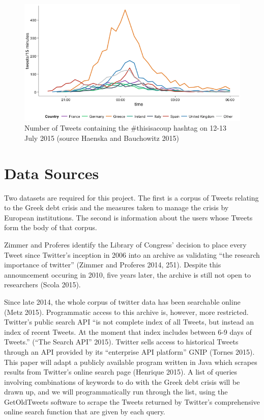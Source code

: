 \documentclass[]{article}
\begin{document}
\begin{figure}[htbp]
\centering
\includegraphics{img/Greece-twitter-2.png}
\caption{Number of Tweets containing the \#thisisacoup hashtag on 12-13
July 2015 (source Haenska and Bauchowitz 2015)}
\end{figure}

\section{Data Sources}\label{data-sources}

Two datasets are required for this project. The first is a corpus of
Tweets relating to the Greek debt crisis and the measures taken to
manage the crisis by European institutions. The second is information
about the users whose Tweets form the body of that corpus.

Zimmer and Proferes identify the Library of Congress' decision to place
every Tweet since Twitter's inception in 2006 into an archive as
validating ``the research importance of twitter'' (Zimmer and Proferes
2014, 251). Despite this announcement occuring in 2010, five years
later, the archive is still not open to researchers (Scola 2015).

Since late 2014, the whole corpus of twitter data has been searchable
online (Metz 2015). Programmatic access to this archive is, however,
more restricted. Twitter's public search API ``is not complete index of
all Tweets, but instead an index of recent Tweets. At the moment that
index includes between 6-9 days of Tweets.'' (``The Search API'' 2015).
Twitter sells access to historical Tweets through an API provided by its
``enterprise API platform'' GNIP (Tornes 2015). This paper will adapt a
publicly available program written in Java which scrapes results from
Twitter's online search page (Henrique 2015). A list of queries
involving combinations of keywords to do with the Greek debt crisis will
be drawn up, and we will programmatically run through the list, using
the GetOldTweets software to scrape the Tweets returned by Twitter's
comprehensive online search function that are given by each query.
\end{document}
